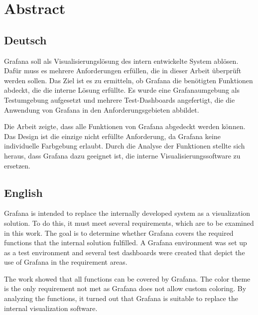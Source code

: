 \documentclass[a4paper, 12pt, oneside]{scrbook}
\begin{document}
	\frontmatter
	
	\tableofcontents
	\listoffigures
	\listoftables
	\nocite{*}

	\mainmatter
	
	\chapter*{Abstract}
	
	\section*{Deutsch}
	
	\noindent Grafana soll als Visualisierungslösung des intern entwickelte System ablösen. Dafür muss es mehrere Anforderungen erfüllen, die in dieser Arbeit überprüft werden sollen. Das Ziel ist es zu ermitteln, ob Grafana die benötigten Funktionen abdeckt, die die interne Lösung erfüllte. Es wurde eine Grafanaumgebung als Testumgebung aufgesetzt und mehrere Test-Dashboards angefertigt, die die Anwendung von Grafana in den Anforderungsgebieten abbildet.
		
	\noindent Die Arbeit zeigte, dass alle Funktionen von Grafana abgedeckt werden können. Das Design ist die einzige nicht erfüllte Anforderung, da Grafana keine individuelle Farbgebung erlaubt. Durch die Analyse der Funktionen stellte sich heraus, dass Grafana dazu geeignet ist, die interne Visualisierungssoftware zu ersetzen.
	
	\section*{English}
	
	\noindent Grafana is intended to replace the internally developed system as a visualization solution. To do this, it must meet several requirements, which are to be examined in this work. The goal is to determine whether Grafana covers the required functions that the internal solution fulfilled. A Grafana environment was set up as a test environment and several test dashboards were created that depict the use of Grafana in the requirement areas.
	
	\noindent The work showed that all functions can be covered by Grafana. The color theme is the only requirement not met as Grafana does not allow custom coloring. By analyzing the functions, it turned out that Grafana is suitable to replace the internal visualization software.
	
\end{document}
